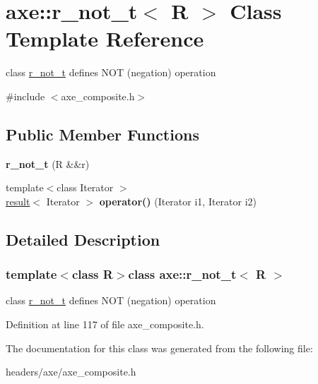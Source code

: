 \hypertarget{classaxe_1_1r__not__t}{\section{axe\+:\+:r\+\_\+not\+\_\+t$<$ R $>$ Class Template Reference}
\label{classaxe_1_1r__not__t}
}


class \hyperlink{classaxe_1_1r__not__t}{r\+\_\+not\+\_\+t} defines N\+O\+T (negation) operation  




{\ttfamily \#include $<$axe\+\_\+composite.\+h$>$}

\subsection*{Public Member Functions}
\begin{DoxyCompactItemize}
\item 
\hypertarget{classaxe_1_1r__not__t_a23ed3836c4421b7a5112dc7e755c184b}{{\bfseries r\+\_\+not\+\_\+t} (R \&\&r)}\label{classaxe_1_1r__not__t_a23ed3836c4421b7a5112dc7e755c184b}

\item 
\hypertarget{classaxe_1_1r__not__t_a85913c6754acf57d184e4e1d96508012}{{\footnotesize template$<$class Iterator $>$ }\\\hyperlink{structaxe_1_1result}{result}$<$ Iterator $>$ {\bfseries operator()} (Iterator i1, Iterator i2)}\label{classaxe_1_1r__not__t_a85913c6754acf57d184e4e1d96508012}

\end{DoxyCompactItemize}


\subsection{Detailed Description}
\subsubsection*{template$<$class R$>$class axe\+::r\+\_\+not\+\_\+t$<$ R $>$}

class \hyperlink{classaxe_1_1r__not__t}{r\+\_\+not\+\_\+t} defines N\+O\+T (negation) operation 

Definition at line 117 of file axe\+\_\+composite.\+h.



The documentation for this class was generated from the following file\+:\begin{DoxyCompactItemize}
\item 
headers/axe/axe\+\_\+composite.\+h\end{DoxyCompactItemize}
